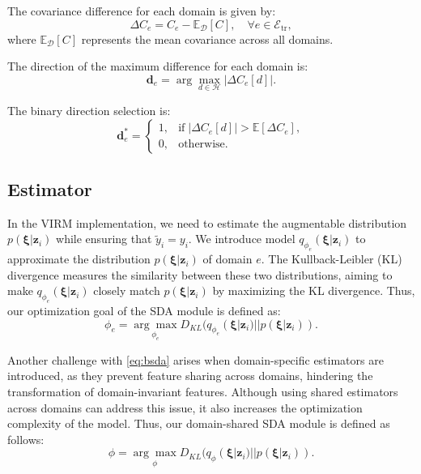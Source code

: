 The covariance difference for each domain is given by:
\begin{equation}
	\Delta C_e = C_e - \mathbb{E}_{\mathcal{D}}[C], \quad \forall e \in \mathcal{E}_{\mathrm{tr} },
\end{equation}
where $\mathbb{E}_{\mathcal{D}}[C]$ represents the mean covariance across all domains.

The direction of the maximum difference for each domain is:
\begin{equation}
	\mathbf{d}_e = \arg\max_{d \in \mathcal{H}} |\Delta C_e[d]|.
\end{equation}

The binary direction selection is:
\begin{equation}
	\mathbf{d}_{e}^* = 
	\begin{cases}
		1, & \text{if} \; |\Delta C_e[d]| > \mathbb{E}[\Delta C_e], \\
		0, & \text{otherwise.}
	\end{cases}
\end{equation}

\subsection{Estimator}
\label{sec:estimator}
In the VIRM implementation, we need to estimate the augmentable distribution $p(\mathbf{\xi} |\mathbf{z}_i)$ while ensuring that $\tilde{y}_i = y_i$.
We introduce model $q_{\phi_e}(\mathbf{\xi}|\mathbf{\mathbf{z}}_i)$ to approximate the distribution $p(\mathbf{\xi} |\mathbf{z}_i)$ of domain $e$.
The Kullback-Leibler (KL) divergence measures the similarity between these two distributions, aiming to make $q_{\phi_e}(\mathbf{\xi} |\mathbf{z}_i)$ closely match $p(\mathbf{\xi} |\mathbf{z}_i)$ by maximizing the KL divergence.
Thus, our optimization goal of the SDA module is defined as:
\begin{equation}
	\label{eq:bsda}
	\phi_e = \underset{\phi_e}{\arg\max} D_{KL}(q_{\phi_e}(\mathbf{\xi}|\mathbf{\mathbf{z}}_i) || p(\mathbf{\xi}|\mathbf{\mathbf{z}}_i)).
\end{equation}

Another challenge with \cref{eq:bsda} arises when domain-specific estimators are introduced, as they prevent feature sharing across domains, hindering the transformation of domain-invariant features. 
Although using shared estimators across domains can address this issue, it also increases the optimization complexity of the model. 
Thus, our domain-shared SDA module is defined as follows:
\begin{equation}
	\label{eq:sdsda}
	\phi = \underset{\phi}{\arg\max} D_{KL}(q_{\phi}(\mathbf{\xi}|\mathbf{\mathbf{z}}_i) || p(\mathbf{\xi}|\mathbf{\mathbf{z}}_i)).
\end{equation}

